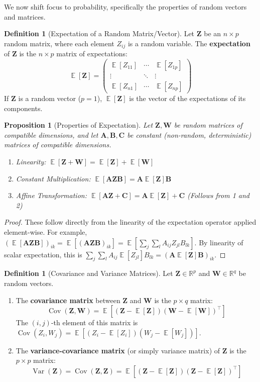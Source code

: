 \documentclass[11pt, a4paper]{article}
\DeclareMathOperator{\E}{\mathbb{E}}             %
\DeclareMathOperator{\Var}{\mathrm{Var}}         %
\DeclareMathOperator{\Cov}{\mathrm{Cov}}         %
\newtheorem{proposition}[theorem]{Proposition}
\theoremstyle{definition}
\newtheorem{definition}[theorem]{Definition}
\theoremstyle{remark}
\newcommand{\RR}{\mathbb{R}}             %
\newcommand{\mat}[1]{\mathbf{#1}}       %
\newcommand{\vect}[1]{\bm{#1}}          %
\newcommand{\transpose}{^{\top}}        %
\begin{document}
We now shift focus to probability, specifically the properties of random vectors and matrices.

\begin{definition}[Expectation of a Random Matrix/Vector]
Let $\mat{Z}$ be an $n \times p$ random matrix, where each element $Z_{ij}$ is a random variable. The \textbf{expectation} of $\mat{Z}$ is the $n \times p$ matrix of expectations:
\[ \E[\mat{Z}] = \begin{pmatrix} \E[Z_{11}] & \cdots & \E[Z_{1p}] \\ \vdots & \ddots & \vdots \\ \E[Z_{n1}] & \cdots & \E[Z_{np}] \end{pmatrix} \]
If $\mat{Z}$ is a random vector ($p=1$), $\E[\vect{Z}]$ is the vector of the expectations of its components.
\end{definition}

\begin{proposition}[Properties of Expectation]
Let $\mat{Z}, \mat{W}$ be random matrices of compatible dimensions, and let $\mat{A}, \mat{B}, \mat{C}$ be constant (non-random, deterministic) matrices of compatible dimensions.
\begin{enumerate}
    \item Linearity: $\E[\mat{Z} + \mat{W}] = \E[\mat{Z}] + \E[\mat{W}]$
    \item Constant Multiplication: $\E[\mat{A} \mat{Z} \mat{B}] = \mat{A} \E[\mat{Z}] \mat{B}$
    \item Affine Transformation: $\E[\mat{A} \mat{Z} + \mat{C}] = \mat{A} \E[\mat{Z}] + \mat{C}$ (Follows from 1 and 2)
\end{enumerate}
\end{proposition}
\begin{proof}
These follow directly from the linearity of the expectation operator applied element-wise. For example, $(\E[\mat{A}\mat{Z}\mat{B}])_{ik} = \E[(\mat{A}\mat{Z}\mat{B})_{ik}] = \E[\sum_j \sum_l A_{ij} Z_{jl} B_{lk}]$. By linearity of scalar expectation, this is $\sum_j \sum_l A_{ij} \E[Z_{jl}] B_{lk} = (\mat{A} \E[\mat{Z}] \mat{B})_{ik}$.
\end{proof}

\begin{definition}[Covariance and Variance Matrices]
Let $\vect{Z} \in \RR^p$ and $\vect{W} \in \RR^q$ be random vectors.
\begin{enumerate}
    \item The \textbf{covariance matrix} between $\vect{Z}$ and $\vect{W}$ is the $p \times q$ matrix:
    \[ \Cov(\vect{Z}, \vect{W}) = \E\left[ (\vect{Z} - \E[\vect{Z}]) (\vect{W} - \E[\vect{W}])\transpose \right] \]
    The $(i, j)$-th element of this matrix is $\Cov(Z_i, W_j) = \E[(Z_i - \E[Z_i])(W_j - \E[W_j])]$.

    \item The \textbf{variance-covariance matrix} (or simply variance matrix) of $\vect{Z}$ is the $p \times p$ matrix:
    \[ \Var(\vect{Z}) = \Cov(\vect{Z}, \vect{Z}) = \E\left[ (\vect{Z} - \E[\vect{Z}]) (\vect{Z} - \E[\vect{Z}])\transpose \right] \]
\end{enumerate}
\end{definition}
\end{document}
